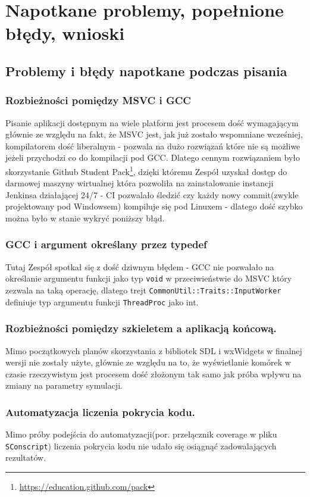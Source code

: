 \documentclass{article}
\begin{document}
	\section{Napotkane problemy, popełnione błędy, wnioski}
	
	\subsection{Problemy i błędy napotkane podczas pisania}
	\subsubsection{Rozbieżności pomiędzy MSVC i GCC}
	Pisanie aplikacji dostępnym na wiele platform jest procesem dość wymagającym głównie ze względu na fakt, że MSVC jest, jak już zostało wspomniane wcześniej, kompilatorem dość liberalnym - pozwala na dużo rozwiązań które nie są możliwe jeżeli przychodzi co do kompilacji pod GCC. Dlatego cennym rozwiązaniem było skorzystanie Github Student Pack\footnote{\url{https://education.github.com/pack}}, dzięki któremu Zespół uzyskał dostęp do darmowej maszyny wirtualnej która pozwoliła na zainstalowanie instancji Jenkinsa działającej 24/7 - CI pozwalało śledzić czy każdy nowy commit(zwykle projektowany pod Windowsem) kompiluje się pod Linuxem - dlatego dość szybko można było w stanie wykryć poniższy błąd.
	\subsubsection{GCC i argument określany przez typedef}
	Tutaj Zespół spotkał się z dość dziwnym błędem - GCC nie pozwalało na określanie argumentu funkcji jako typ \texttt{void} w przeciwieństwie do MSVC  który zezwala na taką operację, dlatego trejt \texttt{CommonUtil::Traits::InputWorker} definiuje typ argumentu funkcji \texttt{ThreadProc} jako int.

	\subsubsection{Rozbieżności pomiędzy szkieletem a aplikacją końcową.}
	Mimo początkowych planów skorzystania z bibliotek SDL i wxWidgets w finalnej wersji nie zostały użyte, głównie ze względu na to, że wyświetlanie komórek w czasie rzeczywistym jest procesem dość złożonym tak samo jak próba wpływu na zmiany na parametry symulacji. 
	
	\subsubsection{Automatyzacja liczenia pokrycia kodu.}
	Mimo próby podejścia do automatyzacji(por. przełącznik coverage w pliku \texttt{SConscript}) liczenia pokrycia kodu nie udało się osiągnąć zadowalających rezultatów.
	
\end{document}

